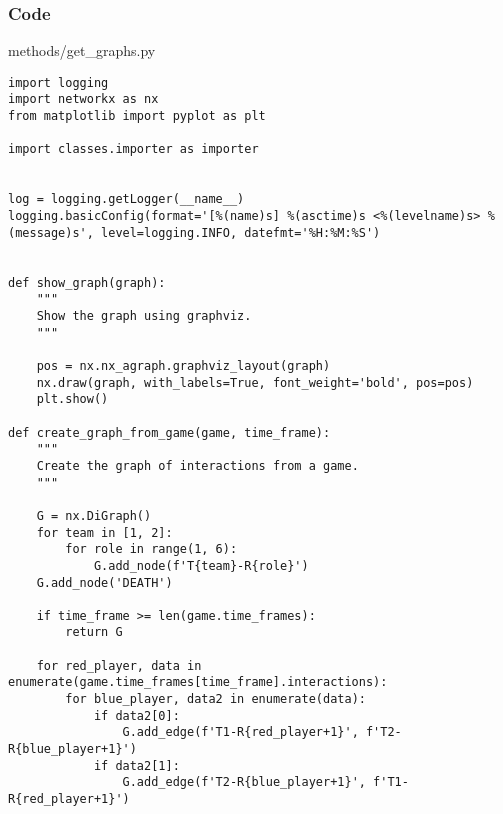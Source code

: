 \documentclass{beamer}
\begin{document}
\begin{frame}[fragile]
    \frametitle{Code}
    \scriptsize
    methods/get\_graphs.py \newline
    \fontsize{3pt}{5pt}\selectfont
    \begin{verbatim}
import logging
import networkx as nx
from matplotlib import pyplot as plt

import classes.importer as importer


log = logging.getLogger(__name__)
logging.basicConfig(format='[%(name)s] %(asctime)s <%(levelname)s> %(message)s', level=logging.INFO, datefmt='%H:%M:%S')


def show_graph(graph):
    """
    Show the graph using graphviz.
    """
    
    pos = nx.nx_agraph.graphviz_layout(graph)
    nx.draw(graph, with_labels=True, font_weight='bold', pos=pos)
    plt.show()

def create_graph_from_game(game, time_frame):
    """
    Create the graph of interactions from a game.
    """
    
    G = nx.DiGraph()
    for team in [1, 2]:
        for role in range(1, 6):
            G.add_node(f'T{team}-R{role}')
    G.add_node('DEATH')
    
    if time_frame >= len(game.time_frames):
        return G

    for red_player, data in enumerate(game.time_frames[time_frame].interactions):
        for blue_player, data2 in enumerate(data):
            if data2[0]:
                G.add_edge(f'T1-R{red_player+1}', f'T2-R{blue_player+1}')
            if data2[1]:
                G.add_edge(f'T2-R{blue_player+1}', f'T1-R{red_player+1}')
    \end{verbatim}
\end{frame}
\end{document}
